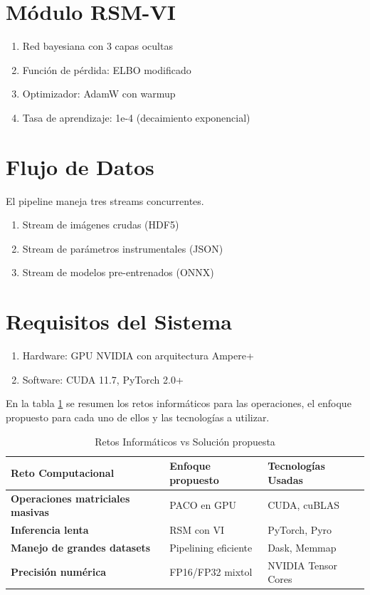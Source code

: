 \section{Módulo RSM-VI}
\begin{enumerate}
    \item Red bayesiana con 3 capas ocultas     
    \item Función de pérdida: ELBO modificado \cite{sjölund2023tutorialparametricvariationalinference}
    \item Optimizador: AdamW con warmup  
    \item Tasa de aprendizaje: 1e-4 (decaimiento exponencial)    
\end{enumerate}
\section{Flujo de Datos} El pipeline maneja tres streams concurrentes.
\begin{enumerate}
    \item Stream de imágenes crudas (HDF5)    
    \item Stream de parámetros instrumentales (JSON)
    \item Stream de modelos pre-entrenados (ONNX)
\end{enumerate}
\section{Requisitos del Sistema} 
\begin{enumerate}
    \item Hardware: GPU NVIDIA con arquitectura Ampere+  
    \item Software: CUDA 11.7, PyTorch 2.0+
\end{enumerate}

En la tabla \ref{tab:retos_solucion} se resumen los retos informáticos para las operaciones, el enfoque propuesto para cada uno de ellos y las tecnologías a utilizar.

	\begin{table}[H]
		\centering
		\small
		\begin{tabular}{p{5cm}p{5cm}p{5cm}}
			\toprule
			\textbf{Reto Computacional} &  
                \textbf{Enfoque propuesto} &  
                \textbf{Tecnologías Usadas}\\
			\midrule
			\textbf{Operaciones matriciales masivas}  & PACO en GPU     & CUDA, cuBLAS    \\
			\midrule
			\textbf{Inferencia lenta} & RSM con VI & PyTorch, Pyro     \\
            \midrule
            \textbf{Manejo de grandes datasets} & Pipelining eficiente & Dask, Memmap     \\
			\midrule
			\textbf{Precisión numérica} & FP16/FP32 mixtol & NVIDIA Tensor Cores     \\
			\bottomrule
		\end{tabular}
        \caption{Retos Informáticos vs Solución propuesta}
        \label{tab:retos_solucion}
	\end{table}
    \newpage
